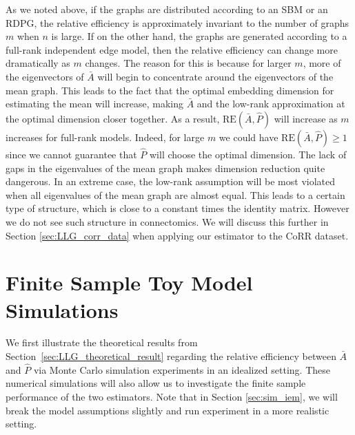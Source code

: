 \begin{remark}
\label{remark:low_rank}
As we noted above, if the graphs are distributed according to an SBM or an RDPG, the relative efficiency is approximately invariant to the number of graphs $m$ when $n$ is large.
If on the other hand, the graphs are generated according to a full-rank independent edge model, then the relative efficiency can change more dramatically as $m$ changes. 
The reason for this is because for larger $m$, more of the eigenvectors of $\bar{A}$ will begin to concentrate around the eigenvectors of the mean graph.
This leads to the fact that the optimal embedding dimension for estimating the mean will increase, making $\bar{A}$ and the low-rank approximation at the optimal dimension closer together. 
As a result, $\mathrm{RE}(\bar{A},\hat{P})$ will increase as $m$ increases for full-rank models.
Indeed, for large $m$ we could have $\mathrm{RE}(\bar{A},\hat{P})\geq 1$ since we cannot guarantee that $\hat{P}$ will choose the optimal dimension.
The lack of gaps in the eigenvalues of the mean graph makes dimension reduction quite dangerous.
In an extreme case, the low-rank assumption will be most violated when all eigenvalues of the mean graph are almost equal. This leads to a certain type of structure, which is close to a constant times the identity matrix. However we do not see such structure in connectomics.
We will discuss this further in Section \ref{sec:LLG_corr_data} when applying our estimator to the CoRR dataset.
\end{remark}






\section{Finite Sample Toy Model Simulations}
\label{sec:sbm_sim}

We first illustrate the theoretical results from Section~\ref{sec:LLG_theoretical_result} regarding the relative efficiency between $\bar{A}$ and $\hat{P}$ via Monte Carlo simulation experiments in an idealized setting.
These numerical simulations will also allow us to investigate the finite sample performance of the two estimators.
Note that in Section \ref{sec:sim_iem}, we will break the model assumptions slightly and run experiment in a more realistic setting.

